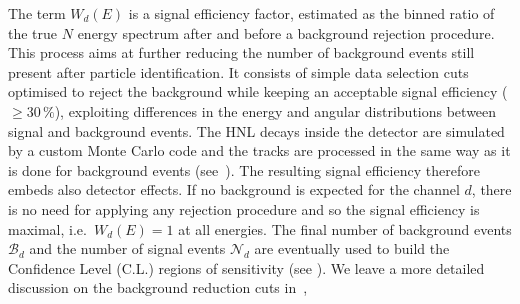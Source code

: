 The term $W_d(E)$ is a signal efficiency factor, estimated as the binned ratio of the true $N$ energy spectrum after %
and before a background rejection procedure.
This process aims at further reducing the number of background events still present after particle identification.
It consists of simple data selection cuts optimised to reject the background while keeping an acceptable signal efficiency %
($\geq 30\,\%$), exploiting differences in the energy and angular distributions between signal and background events.
The HNL decays inside the detector are simulated by a custom Monte Carlo code and the tracks are processed in the same way %
as it is done for background events (see~).
The resulting signal efficiency therefore embeds also detector effects.
If no background is expected for the channel $d$, there is no need for applying any rejection procedure %
and so the signal efficiency is maximal, i.e.\ $W_d(E) = 1$ at all energies.
The final number of background events $\mathcal{B}_d$ and the number of signal events $\mathcal{N}_d$ are %
eventually used to build the Confidence Level (C.L.) regions of sensitivity (see ).
%
We leave a more detailed discussion on the background reduction cuts in~, %
